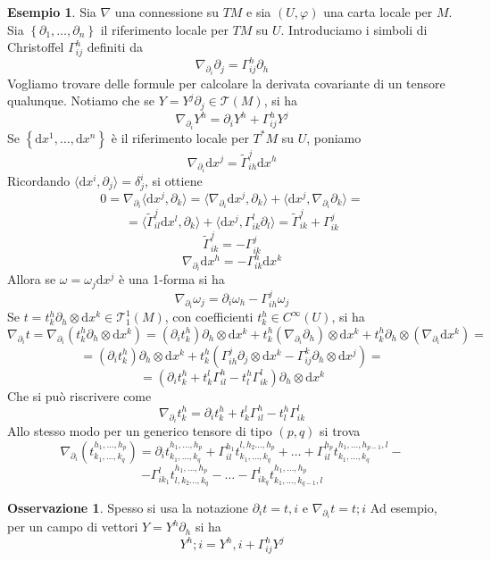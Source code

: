\documentclass[a4paper,11pt]{article}
\theoremstyle{definition}
\newtheorem{osservazione}{Osservazione}[section]
\newtheorem{esempio}{Esempio}[section]
\theoremstyle{theorem}
\newcommand{\dif}{\mathrm{d}}
\newcommand{\T}{\mathcal{T}}
\begin{document}
\begin{esempio}
	Sia $\nabla$ una connessione su $TM$ e sia $(U,\varphi)$ una carta locale per $M$. Sia $\left\{\partial_1,\dots,\partial_n\right\}$ il riferimento locale per $TM$ su $U$. Introduciamo i simboli di Christoffel $\Gamma^h_{ij}$ definiti da
	\[\nabla_{\partial_i}\partial_j=\Gamma^h_{ij}\partial_h\]
	Vogliamo trovare delle formule per calcolare la derivata covariante di un tensore qualunque. Notiamo che se $Y=Y^j\partial_j\in\T(M)$, si ha
	\[\nabla_{\partial_i}Y^h=\partial_i Y^h+\Gamma^h_{ij}Y^j\]
	Se $\left\{\dif x^1,\dots,\dif x^n\right\}$ è il riferimento locale per $T^*M$ su $U$, poniamo
	\[\nabla_{\partial_i}\dif x^j=\tilde{\Gamma}^j_{ih}\dif x^h\]
	Ricordando $\langle\dif x^i,\partial_j\rangle=\delta^i_j$, si ottiene
	\[0=\nabla_{\partial_i}\langle\dif x^j,\partial_k\rangle=\langle\nabla_{\partial_i}\dif x^j,\partial_k\rangle+\langle\dif x^j,\nabla_{\partial_i}\partial_k\rangle=\]\[=\langle\tilde{\Gamma}^j_{il}\dif x^l,\partial_k\rangle+\langle\dif x^j,\Gamma^l_{ik}\partial_l\rangle=\tilde{\Gamma}^j_{ik}+\Gamma^j_{ik}\]
	\[\tilde{\Gamma}^j_{ik}=-\Gamma^j_{ik}\]
	\[\nabla_{\partial_i}\dif x^h=-\Gamma^h_{ik}\dif x^k\]
	Allora se $\omega=\omega_j\dif x^j$ è una 1-forma si ha
	\[\nabla_{\partial_i}\omega_j=\partial_i\omega_h-\Gamma^j_{ih}\omega_j\]
	Se $t=t^h_k\partial_h\otimes\dif x^k\in\T^1_1(M)$, con coefficienti $t^h_k\in C^\infty(U)$, si ha
	\[\nabla_{\partial_i}t=\nabla_{\partial_i}\left(t^h_k\partial_h\otimes\dif x^k\right)=\left(\partial_it^h_k\right)\partial_h\otimes\dif x^k+t^h_k\left(\nabla_{\partial_i}\partial_h\right)\otimes\dif x^k+t^h_k\partial_h\otimes\left(\nabla_{\partial_i}\dif x^k\right)=\]	\[=\left(\partial_it^h_k\right)\partial_h\otimes\dif x^k+t^h_k\left(\Gamma^j_{ih}\partial_j\otimes\dif x^k-\Gamma^k_{ij}\partial_h\otimes\dif x^j\right)=\]\[=\left(\partial_it^h_k+t^l_k\Gamma^h_{il}-t^h_l\Gamma^l_{ik}\right)\partial_h\otimes\dif x^k\]
	Che si può riscrivere come
	\[\nabla_{\partial_i}t^h_k=\partial_it^h_k+t^l_k\Gamma^h_{il}-t^h_l\Gamma^l_{ik}\]
	Allo stesso modo per un generico tensore di tipo $(p,q)$ si trova
	\[\nabla_{\partial_i}\left(t^{h_1,\dots,h_p}_{k_1,\dots,k_q}\right)=\partial_it^{h_1,\dots,h_p}_{k_1,\dots,k_q}+\Gamma^{h_1}_{il}t^{l,h_2\dots,h_p}_{k_1,\dots,k_q}+\dots+\Gamma^{h_p}_{il}t^{h_1,\dots,h_{p-1},l}_{k_1,\dots,k_q}-\]\[-\Gamma^l_{ik_1}t^{h_1,\dots,h_p}_{l,k_2\dots,k_q}-\dots-\Gamma^{l}_{ik_q}t^{h_1,\dots,h_p}_{k_1,\dots,k_{q-1},l}\]
\end{esempio}
\begin{osservazione}
	Spesso si usa la notazione $\partial_it=t,i$ e $\nabla_{\partial_i}t=t;i$
	Ad esempio, per un campo di vettori $Y=Y^h\partial_h$ si ha
	\[Y^h;i=Y^h,i+\Gamma^h_{ij}Y^j\]
\end{osservazione}
\end{document}
